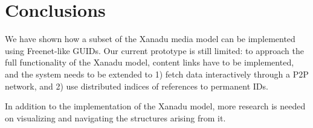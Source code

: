 \documentclass{sig-alternate}
\begin{document}
\break
\section{Conclusions}

We have shown how a subset of the Xanadu media model can be implemented
using Freenet-like GUIDs.
Our current prototype is still limited:
to approach the full functionality of the Xanadu model, content links
have to be implemented, and the system
needs to be extended to 1) fetch data interactively through a P2P
network, and 2) use distributed indices of references to permanent IDs.

In addition to the implementation of the Xanadu model,
more research is needed on visualizing and navigating the structures
arising from it.

% 


% 


\end{document}
